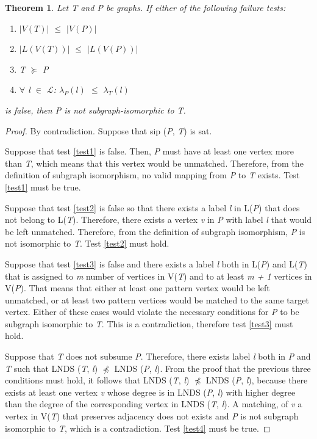 \documentclass{l4proj}
\newtheorem{theorem}{Theorem}[section]
\newcommand{\Lagr}{\mathcal{L}}
\begin{document}
\begin{theorem}
\label{th:nds}
Let \emph{T} and \emph{P} be graphs. If either of the following failure tests:
\begin{enumerate}
\item \label{test1} $|V(T)|$ $\leq$ $|V(P)|$
\item \label{test2} $|L(V(T))|$ $\leq$ $|L(V(P))|$
\item \label{test3} T $\succeq$ P
\item \label{test4} $\forall$ \emph{l} $\in$ $\Lagr$: $\lambda_{P}(l)$ $\leq$ $\lambda_{T}(l)$
\end{enumerate}
is false, then \emph{P} is not subgraph-isomorphic to \emph{T}.
\end{theorem}

\begin{proof}
By contradiction. Suppose that \gls{sip} (\emph{P}, \emph{T}) is \gls{sat}.

Suppose that test \ref{test1} is false. Then, \emph{P} must have at least one vertex more than \emph{T}, which means that this vertex would be unmatched. Therefore, from the definition of subgraph isomorphism, no valid mapping from \emph{P} to \emph{T} exists. Test \ref{test1} must be true.

Suppose that test \ref{test2} is false so that there exists a label \emph{l} in L(\emph{P}) that does not belong to L(\emph{T}). Therefore, there exists a vertex \emph{v} in \emph{P} with label \emph{l} that would be left unmatched.  Therefore, from the definition of subgraph isomorphism, \emph{P} is not isomorphic to \emph{T}. Test \ref{test2} must hold.

Suppose that test \ref{test3} is false and there exists a label \emph{l} both in L(\emph{P}) and L(\emph{T}) that is assigned to \emph{m} number of vertices in V(\emph{T}) and to at least \emph{m + 1} vertices in V(\emph{P}). That means that either at least one pattern vertex would be left unmatched, or at least two pattern vertices would be matched to the same target vertex. Either of these cases would violate the necessary conditions for \emph{P} to be subgraph isomorphic to \emph{T}. This is a contradiction, therefore test \ref{test3} must hold.

Suppose that \emph{T} does not subsume \emph{P}. Therefore, there exists label \emph{l} both in \emph{P} and \emph{T} such that LNDS (\emph{T}, \emph{l}) $\npreceq$ LNDS (\emph{P}, \emph{l}). From the proof that the previous three conditions must hold, it follows that LNDS (\emph{T}, \emph{l}) $\npreceq$ LNDS (\emph{P}, \emph{l}), because there exists at least one vertex \emph{v} whose degree is in LNDS (\emph{P}, \emph{l}) with higher degree than the degree of the corresponding vertex  in LNDS (\emph{T}, \emph{l}). A matching, of \emph{v} a vertex in V(\emph{T}) that preserves adjacency does not exists and \emph{P} is not subgraph isomorphic to \emph{T}, which is a contradiction. Test \ref{test4} must be true. 


\end{proof}
\end{document}
